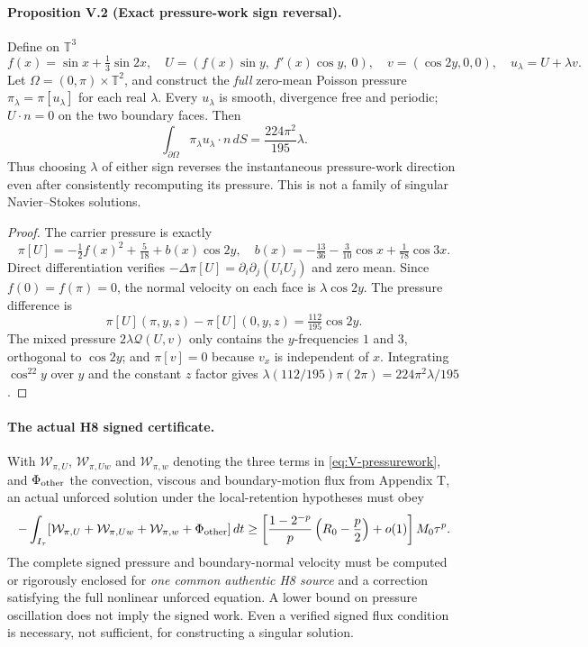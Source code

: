 \paragraph{Proposition V.2 (Exact pressure-work sign reversal).}
Define on $\mathbb T^3$
\[
 f(x)=\sin x+\tfrac13\sin2x,\quad
 U=(f(x)\sin y,\ f'(x)\cos y,\ 0),\quad
 v=(\cos2y,0,0),\quad u_\lambda=U+\lambda v.
\]
Let $\Omega=(0,\pi)\times\mathbb T^2$, and construct the \emph{full}
zero-mean Poisson pressure $\pi_\lambda=\pi[u_\lambda]$ for each real
$\lambda$. Every $u_\lambda$ is smooth, divergence free and periodic;
$U\cdot n=0$ on the two boundary faces. Then
\begin{equation}\label{eq:V-sign}
 \boxed{\int_{\partial\Omega}\pi_\lambda u_\lambda\cdot n\,dS
 =\frac{224\pi^2}{195}\lambda.}
\end{equation}
Thus choosing $\lambda$ of either sign reverses the instantaneous
pressure-work direction even after consistently recomputing its pressure.
This is not a family of singular Navier--Stokes solutions.
\begin{proof}
The carrier pressure is exactly
\[
 \pi[U]=-\tfrac12 f(x)^2+\tfrac5{18}
 +b(x)\cos2y,\quad
 b(x)=-\tfrac{13}{36}-\tfrac3{10}\cos x+\tfrac1{78}\cos3x.
\]
Direct differentiation verifies
$-\Delta\pi[U]=\partial_i\partial_j(U_iU_j)$ and zero mean.
Since $f(0)=f(\pi)=0$, the normal velocity on each face is
$\lambda\cos2y$. The pressure difference is
\[
 \pi[U](\pi,y,z)-\pi[U](0,y,z)
 =\tfrac{112}{195}\cos2y.
\]
The mixed pressure $2\lambda\mathcal Q(U,v)$ only contains the
$y$-frequencies $1$ and $3$, orthogonal to $\cos2y$; and
$\pi[v]=0$ because $v_x$ is independent of $x$.
Integrating $\cos^22y$ over $y$ and the constant $z$ factor gives
$\lambda(112/195)\pi(2\pi)=224\pi^2\lambda/195$.

\end{proof}

\paragraph{The actual H8 signed certificate.}
With $\mathcal W_{\pi,U}$, $\mathcal W_{\pi,Uw}$ and
$\mathcal W_{\pi,w}$ denoting the three terms in
\eqref{eq:V-pressurework}, and $\Phi_{\rm other}$ the convection,
viscous and boundary-motion flux from Appendix T, an actual unforced
solution under the local-retention hypotheses must obey
\begin{equation}\label{eq:V-necessary-gate}
 -\int_{I_\tau}
 [\mathcal W_{\pi,U}+\mathcal W_{\pi,Uw}
 +\mathcal W_{\pi,w}+\Phi_{\rm other}]\,dt
 \ge\left[\frac{1-2^{-p}}p\left(R_0-\frac p2\right)+o(1)\right]
 M_0\tau^p.
\end{equation}
The complete signed pressure and boundary-normal velocity must be
computed or rigorously enclosed for \emph{one common authentic H8 source}
and a correction satisfying the full nonlinear unforced equation.
A lower bound on pressure oscillation does not imply the signed work.
Even a verified signed flux condition is necessary, not sufficient, for
constructing a singular solution.

